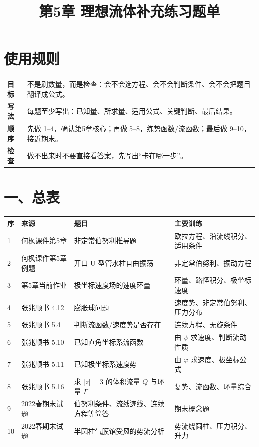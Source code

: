 ﻿\documentclass[UTF8,zihao=-4]{ctexart}
\title{\bfseries 第5章 理想流体补充练习题单}
\author{}
\date{}
\newcommand{\src}[1]{\textcolor{blue!55!black}{#1}}
\begin{document}
\maketitle

\section*{使用规则}

\begin{tabular}{>{\bfseries}p{3cm}p{11.2cm}}
\toprule
目标 & 不是刷数量，而是检查：会不会选方程、会不会判断条件、会不会把题目翻译成公式。\\
写法 & 每题至少写出：已知量、所求量、适用公式、关键判断、最后结果。\\
顺序 & 先做 1--4，确认第5章核心；再做 5--8，练势函数/流函数；最后做 9--10，接近期末。\\
检查 & 做不出来时不要直接看答案，先写出“卡在哪一步”。\\
\bottomrule
\end{tabular}

\section*{一、总表}

\begin{longtable}{p{0.7cm}p{3.1cm}p{5.6cm}p{4.6cm}}
\toprule
\textbf{序} & \textbf{来源} & \textbf{题目} & \textbf{主要训练}\\
\midrule
1 & \src{何枫课件第5章} & 非定常伯努利推导题 & 欧拉方程、沿流线积分、适用条件\\
2 & \src{何枫课件第5章例题} & 开口 U 型管水柱自由振荡 & 非定常伯努利、振动方程\\
3 & \src{第5章当前作业} & 极坐标速度场的速度环量 & 环量、路径积分、极坐标速度\\
4 & \src{张兆顺书 4.12} & 膨胀球问题 & 速度势、非定常伯努利、压力分布\\
5 & \src{张兆顺书 5.4} & 判断流函数/速度势是否存在 & 连续方程、无旋条件\\
6 & \src{张兆顺书 5.10} & 已知直角坐标系流函数 & 由 $\psi$ 求速度、判断流动性质\\
7 & \src{张兆顺书 5.11} & 已知极坐标系速度势 & 由 $\varphi$ 求速度、极坐标公式\\
8 & \src{张兆顺书 5.16} & 求 $|z|=3$ 的体积流量 $Q$ 与环量 $\Gamma$ & 复势、流函数、环量综合\\
9 & \src{2022春期末试题} & 伯努利条件、流线迹线、连续方程等简答 & 期末概念题\\
10 & \src{2022春期末试题} & 半圆柱气膜馆受风的势流分析 & 势流绕圆柱、压力积分、升力\\
\bottomrule
\end{longtable}
\end{document}
